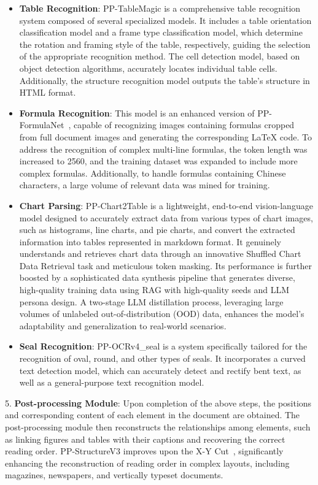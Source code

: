 \documentclass[11pt, a4paper, logo, copyright, nonumbering]{paddleocr}
\begin{document}
\begin{itemize}
    \item \textbf{Table Recognition}: PP-TableMagic is a comprehensive table recognition system composed of several specialized models. It includes a table orientation classification model and a frame type classification model, which determine the rotation and framing style of the table, respectively, guiding the selection of the appropriate recognition method. The cell detection model, based on object detection algorithms, accurately locates individual table cells. Additionally, the structure recognition model outputs the table’s structure in HTML format.
    \item \textbf{Formula Recognition}: This model is an enhanced version of PP-FormulaNet~\citep{liu2025formula}, capable of recognizing images containing formulas cropped from full document images and generating the corresponding LaTeX code. To address the recognition of complex multi-line formulas, the token length was increased to 2560, and the training dataset was expanded to include more complex formulas. Additionally, to handle formulas containing Chinese characters, a large volume of relevant data was mined for training.
    \item \textbf{Chart Parsing}: PP-Chart2Table is a lightweight, end-to-end vision-language model designed to accurately extract data from various types of chart images, such as histograms, line charts, and pie charts, and convert the extracted information into tables represented in markdown format. It genuinely understands and retrieves chart data through an innovative Shuffled Chart Data Retrieval task and meticulous token masking. Its performance is further boosted by a sophisticated data synthesis pipeline that generates diverse, high-quality training data using RAG with high-quality seeds and LLM persona design. A two-stage LLM distillation process, leveraging large volumes of unlabeled out-of-distribution (OOD) data, enhances the model's adaptability and generalization to real-world scenarios.
    \item \textbf{Seal Recognition}: PP-OCRv4\_seal is a system specifically tailored for the recognition of oval, round, and other types of seals. It incorporates a curved text detection model, which can accurately detect and rectify bent text, as well as a general-purpose text recognition model.
\end{itemize}

5. \textbf{Post-processing Module}: Upon completion of the above steps, the positions and corresponding content of each element in the document are obtained. The post-processing module then reconstructs the relationships among elements, such as linking figures and tables with their captions and recovering the correct reading order. PP-StructureV3 improves upon the X-Y Cut~\citep{ha1995recursive}, significantly enhancing the reconstruction of reading order in complex layouts, including magazines, newspapers, and vertically typeset documents.
\end{document}
